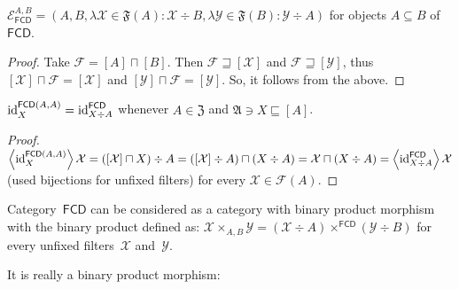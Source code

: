 \begin{prop}
  $\mathcal{E}_{\mathsf{FCD}}^{A,B} = (A , B , \lambda \mathcal{X}
  \in \mathfrak{F} (A) : \mathcal{X} \div B , \lambda \mathcal{Y} \in
  \mathfrak{F} (B) : \mathcal{Y} \div A)$ for objects $A \subseteq B$ of
  $\mathsf{FCD}$.
\end{prop}

\begin{proof}
Take $\mathcal{F}=[A]\sqcap[B]$. Then
$\mathcal{F}\sqsupseteq[\mathcal{X}]$ and
$\mathcal{F}\sqsupseteq[\mathcal{Y}]$,
thus
$[\mathcal{X}]\sqcap\mathcal{F}=[\mathcal{X}]$ and
$[\mathcal{Y}]\sqcap\mathcal{F}=[\mathcal{Y}]$.
So, it follows from the above.
\end{proof}

\begin{prop}
$\operatorname{id}^{\mathsf{FCD}(A,A)}_X=\operatorname{id}^{\mathsf{FCD}}_{X\div A}$
whenever $A\in\mathfrak{Z}$ and
$\mathfrak{A}\ni X\sqsubseteq[A]$.
\end{prop}

\begin{proof}
$\left\langle \operatorname{id}^{\mathsf{FCD}(A,A)}_X\right\rangle\mathcal{X}=
([\mathcal{X}]\sqcap X)\div A=
([\mathcal{X}]\div A)\sqcap(X\div A)=
\mathcal{X}\sqcap(X\div A)=
\left\langle \operatorname{id}^{\mathsf{FCD}}_{X\div A}\right\rangle\mathcal{X}$
(used bijections for unfixed filters)
for every $\mathcal{X}\in\mathscr{F}(A)$.
\end{proof}

\begin{defn}
Category~$\mathsf{FCD}$ can be considered as a category
with binary product morphism with the binary product
defined as:
$\mathcal{X}\times_{A,B}\mathcal{Y}=
(\mathcal{X}\div A)\times^{\mathsf{FCD}}(\mathcal{Y}\div B)$ for every unfixed filters~$\mathcal{X}$
and~$\mathcal{Y}$.
\end{defn}

It is really a binary product morphism:

